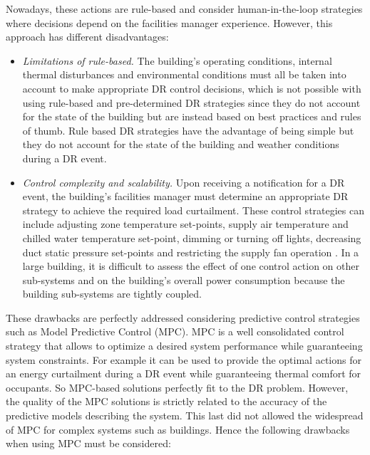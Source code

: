 \textcolor[rgb]{0.00,0.00,1.00}{Nowadays, these actions are rule-based and consider human-in-the-loop strategies where decisions depend on the facilities manager experience. However, this approach has different disadvantages:}

\begin{itemize}[leftmargin=1cm]
	\item \emph{Limitations of rule-based.} The building's operating conditions, internal thermal disturbances and environmental conditions must all be taken into account to make appropriate DR control decisions, which is not possible with using rule-based and pre-determined DR strategies since they do not account for the state of the building but are instead based on best practices and rules of thumb. 
	Rule based DR strategies have the advantage of being simple but they do not account for the state of the building and weather conditions during a DR event.
	\item \emph{Control complexity and scalability.} Upon receiving a notification for a DR event, the building's facilities manager must determine an appropriate DR strategy to achieve the required load curtailment. 
	These control strategies can include adjusting zone temperature set-points, supply air temperature and chilled water temperature set-point, dimming or turning off lights, decreasing duct static pressure set-points and restricting the supply fan operation \etc. 
	In a large building, it is difficult to assess the effect of one control action on other sub-systems and on the building's overall power consumption because the building sub-systems are tightly coupled.
\end{itemize}
\textcolor[rgb]{0.00,0.00,1.00}{These drawbacks are perfectly addressed considering predictive control strategies such as Model Predictive Control (MPC). MPC is a well consolidated control strategy that allows to optimize a desired system performance while guaranteeing system constraints. For example it can be used to provide the optimal actions for an energy curtailment during a DR event while guaranteeing thermal comfort for occupants. So MPC-based solutions perfectly fit to the DR problem. However, the quality of the MPC solutions is strictly related to the accuracy of the predictive models describing the system. This last did not allowed the widespread of MPC for complex systems such as buildings. Hence the following drawbacks when using MPC must be considered:}

